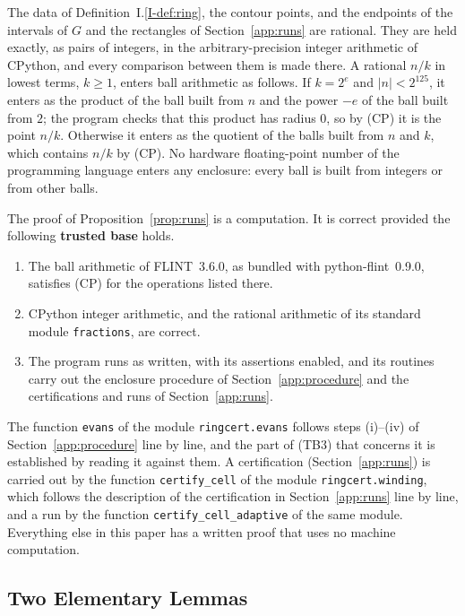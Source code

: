 The data of Definition~I.\ref{I-def:ring}, the contour points, and the endpoints of
the intervals of $G$ and the rectangles of Section~\ref{app:runs} are rational.
They are held exactly, as pairs of integers, in the arbitrary-precision integer
arithmetic of CPython, and every comparison between them is made there. A
rational $n/k$ in lowest terms, $k\ge1$, enters ball arithmetic as follows. If
$k=2^e$ and $|n|<2^{125}$, it enters as the product of the ball built from $n$ and
the power $-e$ of the ball built from $2$; the program checks that this product
has radius $0$, so by (CP) it is the point $n/k$. Otherwise it enters as the
quotient of the balls built from $n$ and $k$, which contains $n/k$ by (CP). No
hardware floating-point number of the programming language enters any enclosure:
every ball is built from integers or from other balls.

The proof of Proposition~\ref{prop:runs} is a computation. It is correct provided
the following \textbf{trusted base} holds.
\begin{enumerate}[label=\textup{(TB\arabic*)}, leftmargin=*]
\item The ball arithmetic of FLINT~3.6.0, as bundled with python-flint~0.9.0,
  satisfies (CP) for the operations listed there.
\item CPython integer arithmetic, and the rational arithmetic of its standard
  module \texttt{fractions}, are correct.
\item The program runs as written, with its assertions enabled, and its routines
  carry out the enclosure procedure of Section~\ref{app:procedure} and the
  certifications and runs of Section~\ref{app:runs}.
\end{enumerate}
The function \texttt{evans} of the module \texttt{ringcert.evans} follows steps
(i)--(iv) of Section~\ref{app:procedure} line by line, and the part of (TB3) that
concerns it is established by reading it against them. A certification (Section~\ref{app:runs})
is carried out by the function \texttt{certify\_cell} of the module
\texttt{ringcert.winding}, which follows the description of the certification in
Section~\ref{app:runs} line by line, and a run
by the function \texttt{certify\_cell\_adaptive} of the same module. Everything
else in this paper has a written proof that uses no machine computation.

\subsection{Two Elementary Lemmas}

